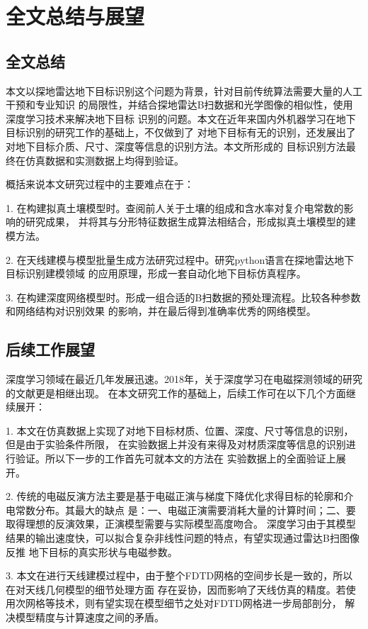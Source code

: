 \chapter{全文总结与展望}

\section{全文总结}
本文以探地雷达地下目标识别这个问题为背景，针对目前传统算法需要大量的人工干预和专业知识
的局限性，并结合探地雷达B扫数据和光学图像的相似性，使用深度学习技术来解决地下目标
识别的问题。本文在近年来国内外机器学习在地下目标识别的研究工作的基础上，不仅做到了
对地下目标有无的识别，还发展出了对地下目标介质、尺寸、深度等信息的识别方法。本文所形成的
目标识别方法最终在仿真数据和实测数据上均得到验证。

概括来说本文研究过程中的主要难点在于：

1. 在构建拟真土壤模型时。查阅前人关于土壤的组成和含水率对复介电常数的影响的研究成果，
并将其与分形特征数据生成算法相结合，形成拟真土壤模型的建模方法。

2. 在天线建模与模型批量生成方法研究过程中。研究python语言在探地雷达地下目标识别建模领域
的应用原理，形成一套自动化地下目标仿真程序。

3. 在构建深度网络模型时。形成一组合适的B扫数据的预处理流程。比较各种参数和网络结构对识别效果
的影响，并在最后得到准确率优秀的网络模型。

\section{后续工作展望}
深度学习领域在最近几年发展迅速。2018年，关于深度学习在电磁探测领域的研究的文献更是相继出现。
在本文研究工作的基础上，后续工作可在以下几个方面继续展开：

1. 本文在仿真数据上实现了对地下目标材质、位置、深度、尺寸等信息的识别，但是由于实验条件所限，
在实验数据上并没有来得及对材质深度等信息的识别进行验证。所以下一步的工作首先可就本文的方法在
实验数据上的全面验证上展开。

2. 传统的电磁反演方法主要是基于电磁正演与梯度下降优化求得目标的轮廓和介电常数分布。其最大的缺点
是：一、电磁正演需要消耗大量的计算时间；二、要取得理想的反演效果，正演模型需要与实际模型高度吻合。
深度学习由于其模型结果的输出速度快，可以拟合复杂非线性问题的特点，有望实现通过雷达B扫图像反推
地下目标的真实形状与电磁参数。

3. 本文在进行天线建模过程中，由于整个FDTD网格的空间步长是一致的，所以在对天线几何模型的细节处理方面
存在妥协，因而影响了天线仿真的精度。若使用次网格等技术，则有望实现在模型细节之处对FDTD网格进一步局部剖分，
解决模型精度与计算速度之间的矛盾。